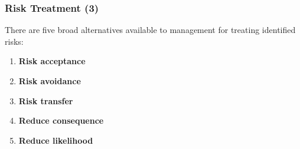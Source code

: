 \documentclass[xcolor ={table,usenames,dvipsnames}]{beamer}
\theoremstyle{definition}
\begin{document}
	\begin{frame}
		\frametitle{Risk Treatment (3)}
		There are five broad alternatives available to management for treating identified risks:
		\begin{enumerate}
			\item\textbf{Risk acceptance}
			\item\textbf{Risk avoidance}
			\item\textbf{Risk transfer}
			\item\textbf{Reduce consequence}
			\item\textbf{Reduce likelihood}
		\end{enumerate}
	\end{frame}

	

	





	

	
\end{document}
